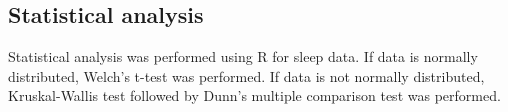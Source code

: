 \subsection*{Statistical analysis}

Statistical analysis was performed using R for sleep data.
If data is normally distributed, Welch's t-test was performed.
If data is not normally distributed, Kruskal-Wallis test followed by Dunn's multiple comparison test was performed.
    